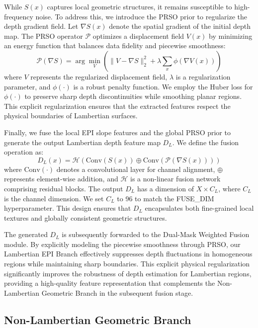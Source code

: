 \documentclass[lettersize,journal]{IEEEtran}
\begin{document}
While $S(x)$ captures local geometric structures, it remains susceptible to high-frequency noise. To address this, we introduce the PRSO prior to regularize the depth gradient field. Let $\nabla S(x)$ denote the spatial gradient of the initial depth map. The PRSO operator $\mathcal{P}$ optimizes a displacement field $V(x)$ by minimizing an energy function that balances data fidelity and piecewise smoothness:
\begin{equation}
\mathcal{P}(\nabla S) = \arg\min_{V} \left( \| V - \nabla S \|_2^2 + \lambda \sum_{x} \phi(\nabla V(x)) \right)
\label{eq:ch3_10}
\end{equation}
where $V$ represents the regularized displacement field, $\lambda$ is a regularization parameter, and $\phi(\cdot)$ is a robust penalty function. We employ the Huber loss for $\phi(\cdot)$ to preserve sharp depth discontinuities while smoothing planar regions. This explicit regularization ensures that the extracted features respect the physical boundaries of Lambertian surfaces.

Finally, we fuse the local EPI slope features and the global PRSO prior to generate the output Lambertian depth feature map $D_L$. We define the fusion operation as:
\begin{equation}
D_L(x) = \mathcal{H} \left( \text{Conv}(S(x)) \oplus \text{Conv}(\mathcal{P}(\nabla S(x))) \right)
\label{eq:ch3_11}
\end{equation}
where $\text{Conv}(\cdot)$ denotes a convolutional layer for channel alignment, $\oplus$ represents element-wise addition, and $\mathcal{H}$ is a non-linear fusion network comprising residual blocks. The output $D_L$ has a dimension of $X \times C_L$, where $C_L$ is the channel dimension. We set $C_L$ to 96 to match the FUSE\_DIM hyperparameter. This design ensures that $D_L$ encapsulates both fine-grained local textures and globally consistent geometric structures.

The generated $D_L$ is subsequently forwarded to the Dual-Mask Weighted Fusion module. By explicitly modeling the piecewise smoothness through PRSO, our Lambertian EPI Branch effectively suppresses depth fluctuations in homogeneous regions while maintaining sharp boundaries. This explicit physical regularization significantly improves the robustness of depth estimation for Lambertian regions, providing a high-quality feature representation that complements the Non-Lambertian Geometric Branch in the subsequent fusion stage.

\subsection{Non-Lambertian Geometric Branch}
\end{document}
